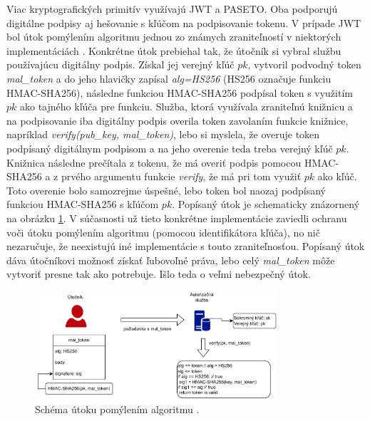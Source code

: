 Viac kryptografických primitív využívajú JWT a PASETO. Oba podporujú digitálne podpisy aj hešovanie s kľúčom na podpisovanie tokenu. V prípade JWT bol útok pomýlením algoritmu jednou zo známych zraniteľností v niektorých implementáciách \cite{jwt_vul}. Konkrétne útok prebiehal tak, že útočník si vybral službu používajúcu digitálny podpis. Získal jej verejný kľúč $pk$, vytvoril podvodný token \textit{mal\_token} a do jeho hlavičky zapísal \textit{alg=HS256} (HS256 označuje funkciu HMAC-SHA256), následne funkciou HMAC-SHA256 podpísal token s využitím $pk$ ako tajného kľúča pre funkciu. Služba, ktorá využívala zraniteľnú knižnicu a na podpisovanie iba digitálny podpis overila token zavolaním funkcie knižnice, napríklad \textit{verify(pub\_key, mal\_token)}, lebo si myslela, že overuje token podpísaný digitálnym podpisom a na jeho overenie teda treba verejný kľúč $pk$. Knižnica následne prečítala z tokenu, že má overiť podpis pomocou HMAC-SHA256 a z prvého argumentu funkcie \textit{verify}, že má pri tom využiť $pk$ ako kľúč. Toto overenie bolo samozrejme úspešné, lebo token bol naozaj podpísaný funkciou HMAC-SHA256 s kľúčom $pk$. Popísaný útok je schematicky znázornený na obrázku \ref{fig:conf_alg_attack}. V súčasnosti už tieto konkrétne implementácie zaviedli ochranu voči útoku pomýlením algoritmu (pomocou identifikátora kľúča), no nič nezaručuje, že neexistujú iné implementácie s touto zraniteľnosťou. Popísaný útok dáva útočníkovi možnosť získať ľubovoľné práva, lebo celý \textit{mal\_token} môže vytvoriť presne tak ako potrebuje. Išlo teda o veľmi nebezpečný útok.

\begin{figure}
  \centerline{\includegraphics[width=0.8\textwidth]{images/conf_alg_attack}}
  \caption[Útok pomýlením algortimu]{Schéma útoku pomýlením algoritmu \cite{jwt_vul}.}
  \label{fig:conf_alg_attack}
\end{figure}


